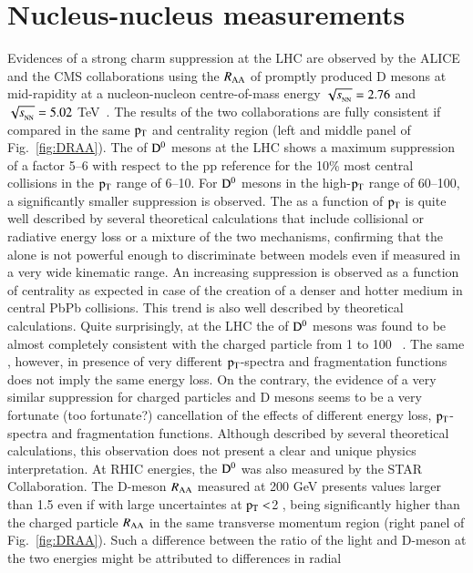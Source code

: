 \documentclass{webofc}
\begin{document}
\section{Nucleus-nucleus measurements}
\label{AAmeasurements}
Evidences of a strong charm suppression at the LHC are observed by the ALICE and the CMS collaborations using the $R_{\mathrm{AA}}$
of promptly produced D mesons at mid-rapidity at a nucleon-nucleon centre-of-mass energy $\sqrtsNN=2.76$ and $\sqrtsNN=5.02$ TeV~\cite{DAA1,DAA2,DAA3}. 
The results of the two collaborations are fully consistent if compared in the same $\rm p_{\rm T} $ and centrality region (left and middle panel of Fig.~\ref{fig:DRAA}). The \raa of $\rm D^{0}$ mesons at the LHC shows a maximum suppression of 
a factor 5--6 with respect to the pp reference for the 10\% most central collisions in the $\rm p_{\rm T} $ range of 6--10\GeVc. For $\rm D^{0}$ mesons in the high-$\rm p_{\rm T} $ range of 60--100\GeVc, a significantly smaller suppression is observed. 
The \raa as a function of $\rm p_{\rm T} $ is quite well described by several theoretical calculations that include collisional or radiative energy loss or a mixture of the two mechanisms, confirming that the 
\raa alone is not powerful enough to discriminate between models even if measured in a very wide kinematic range.
An increasing suppression is observed as a function of centrality as expected in case of the creation of a denser and hotter medium in central PbPb collisions. This trend is also 
well described by theoretical calculations. Quite surprisingly, at the LHC the \raa of $\rm D^{0}$ mesons was found to be almost 
completely consistent with the charged particle \raa from 1 to 100 \GeVc~\cite{charged}. The same \raa, however, in presence of very different $\rm p_{\rm T} $-spectra and fragmentation 
functions does not imply the same energy loss. On the contrary, the evidence of a very similar suppression for charged particles and D mesons seems to be a very fortunate (too fortunate?) cancellation of the effects
of different energy loss, $\rm p_{\rm T} $-spectra and fragmentation functions. Although described by several theoretical calculations, this observation does not present a clear and unique physics interpretation\footnotemark[\value{footnote}].
At RHIC energies, the $\rm D^{0}$ \raa was also measured by the STAR Collaboration. The D-meson $R_{\mathrm{AA}}$ measured at 200 GeV presents values larger than 1.5 even if with large uncertaintes at $\rm p_{\rm T} <$2 \GeVc, being significantly higher than 
the charged particle $R_{\mathrm{AA}}$ in the same transverse momentum region (right panel of Fig.~\ref{fig:DRAA}). Such a difference between the ratio of the light and D-meson \raa at the two energies might be attributed to differences in radial 
\end{document}
